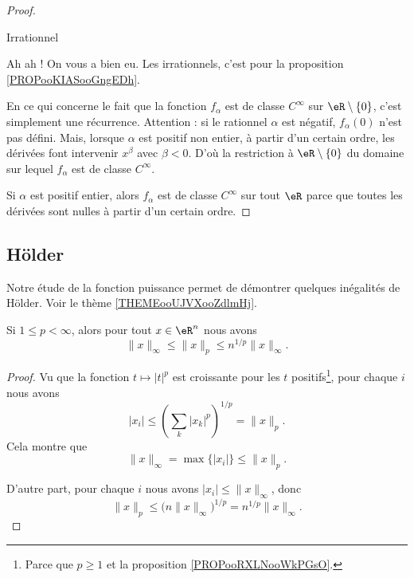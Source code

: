 \begin{proof}
\begin{subproof}
        \item[Irrationnel]

            Ah ah ! On vous a bien eu. Les irrationnels, c'est pour la proposition \ref{PROPooKIASooGngEDh}.
    \end{subproof}
    En ce qui concerne le fait que la fonction \( f_{\alpha}\) est de classe \(  C^{\infty}\) sur \( \eR\setminus\{ 0 \}\), c'est simplement une récurrence. Attention : si le rationnel \( \alpha\) est négatif, \( f_{\alpha}(0)\) n'est pas défini. Mais, lorsque \( \alpha\) est positif non entier, à partir d'un certain ordre, les dérivées font intervenir \( x^{\beta}\) avec \( \beta<0\). D'où la restriction à \( \eR\setminus\{ 0 \}\) du domaine sur lequel \( f_{\alpha}\) est de classe \(  C^{\infty}\).

    Si \( \alpha\) est positif entier, alors \( f_{\alpha}\) est de classe \(  C^{\infty}\) sur tout \( \eR\) parce que toutes les dérivées sont nulles à partir d'un certain ordre.
\end{proof}

\subsection{Hölder}

Notre étude de la fonction puissance permet de démontrer quelques inégalités de Hölder. Voir le thème \ref{THEMEooUJVXooZdlmHj}.

\begin{theorem}       \label{THOooPPDPooJxTYIy}
    Si \( 1\leq p <  \infty\), alors pour tout \( x\in \eR^n\) nous avons
    \begin{equation}
        \| x \|_{\infty}\leq \| x \|_p\leq n^{1/p}\| x \|_{\infty}.
    \end{equation}
\end{theorem}

\begin{proof}
    Vu que la fonction \( t\mapsto | t |^p\) est croissante pour les \( t \) positifs\footnote{Parce que \( p\geq 1\) et la proposition \ref{PROPooRXLNooWkPGsO}.}, pour chaque \( i\) nous avons
    \begin{equation}
        | x_i |\leq \left( \sum_k| x_k |^p \right)^{1/p}=\| x \|_p.
    \end{equation}
    Cela montre que
    \begin{equation}
        \| x \|_{\infty}=\max\{ | x_i | \}\leq \| x \|_p.
    \end{equation}
    
    D'autre part, pour chaque \( i\) nous avons \( | x_i |\leq \| x \|_{\infty}\), donc
    \begin{equation}
        \| x \|_p\leq \big( n\| x \|_{\infty} \big)^{1/p}=n^{1/p}\| x \|_{\infty}.
    \end{equation}
\end{proof}

